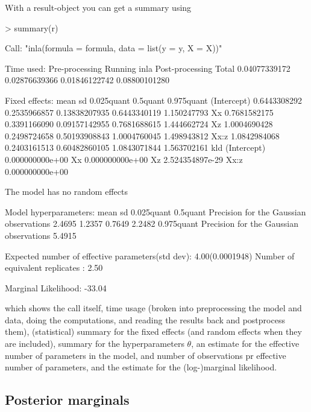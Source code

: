 \documentclass[a4paper,11pt]{report}
\begin{document}
With a result-object you can get a summary using
\begin{Schunk}
\begin{Sinput}
> summary(r)
\end{Sinput}
\begin{Soutput}
Call:
"inla(formula = formula, data = list(y = y, X = X))"

Time used:
 Pre-processing    Running inla Post-processing           Total 
  0.04077339172   0.02876639366   0.01846122742   0.08800101280 

Fixed effects:
                    mean           sd    0.025quant     0.5quant  0.975quant
(Intercept) 0.6443308292 0.2535966857 0.13838207935 0.6443340119 1.150247793
Xx          0.7681582175 0.3391166090 0.09157142955 0.7681688615 1.444662724
Xz          1.0004690428 0.2498724658 0.50193908843 1.0004760045 1.498943812
Xx:z        1.0842984068 0.2403161513 0.60482860105 1.0843071844 1.563702161
                        kld
(Intercept) 0.000000000e+00
Xx          0.000000000e+00
Xz          2.524354897e-29
Xx:z        0.000000000e+00

The model has no random effects

Model hyperparameters:
                                        mean   sd     0.025quant 0.5quant
Precision for the Gaussian observations 2.4695 1.2357 0.7649     2.2482  
                                        0.975quant
Precision for the Gaussian observations 5.4915    

Expected number of effective parameters(std dev): 4.00(0.0001948)
Number of equivalent replicates : 2.50 

Marginal Likelihood:  -33.04 
\end{Soutput}
\end{Schunk}
which shows the call itself, time usage (broken into preprocessing the
model and data, doing the computations, and reading the results back
and postprocess them), (statistical) summary for the fixed effects
(and random effects when they are included), summary for the
hyperparameters $\theta$, an estimate for the effective number of
parameters in the model, and number of observations pr effective
number of parameters, and the estimate for the (log-)marginal
likelihood.

\subsection{Posterior marginals}
\end{document}
